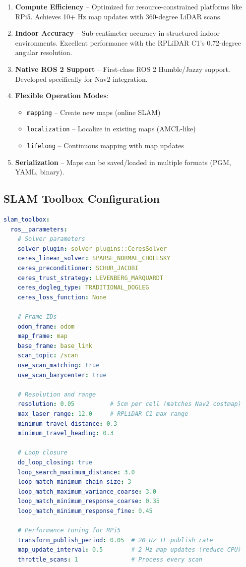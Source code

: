\begin{enumerate}
    \item \textbf{Compute Efficiency} -- Optimized for resource-constrained platforms like RPi5. Achieves 10+ Hz map updates with 360-degree LiDAR scans.

    \item \textbf{Indoor Accuracy} -- Sub-centimeter accuracy in structured indoor environments. Excellent performance with the RPLiDAR C1's 0.72-degree angular resolution.

    \item \textbf{Native ROS 2 Support} -- First-class ROS 2 Humble/Jazzy support. Developed specifically for Nav2 integration.

    \item \textbf{Flexible Operation Modes}:
    \begin{itemize}
        \item \texttt{mapping} -- Create new maps (online SLAM)
        \item \texttt{localization} -- Localize in existing maps (AMCL-like)
        \item \texttt{lifelong} -- Continuous mapping with map updates
    \end{itemize}

    \item \textbf{Serialization} -- Maps can be saved/loaded in multiple formats (PGM, YAML, binary).
\end{enumerate}

\subsection{SLAM Toolbox Configuration}

\begin{lstlisting}[language=yaml, caption=slam\_toolbox\_params.yaml]
slam_toolbox:
  ros__parameters:
    # Solver parameters
    solver_plugin: solver_plugins::CeresSolver
    ceres_linear_solver: SPARSE_NORMAL_CHOLESKY
    ceres_preconditioner: SCHUR_JACOBI
    ceres_trust_strategy: LEVENBERG_MARQUARDT
    ceres_dogleg_type: TRADITIONAL_DOGLEG
    ceres_loss_function: None

    # Frame IDs
    odom_frame: odom
    map_frame: map
    base_frame: base_link
    scan_topic: /scan
    use_scan_matching: true
    use_scan_barycenter: true

    # Resolution and range
    resolution: 0.05          # 5cm per cell (matches Nav2 costmap)
    max_laser_range: 12.0     # RPLiDAR C1 max range
    minimum_travel_distance: 0.3
    minimum_travel_heading: 0.3

    # Loop closure
    do_loop_closing: true
    loop_search_maximum_distance: 3.0
    loop_match_minimum_chain_size: 3
    loop_match_maximum_variance_coarse: 3.0
    loop_match_minimum_response_coarse: 0.35
    loop_match_minimum_response_fine: 0.45

    # Performance tuning for RPi5
    transform_publish_period: 0.05  # 20 Hz TF publish rate
    map_update_interval: 0.5        # 2 Hz map updates (reduce CPU)
    throttle_scans: 1               # Process every scan
\end{lstlisting}

